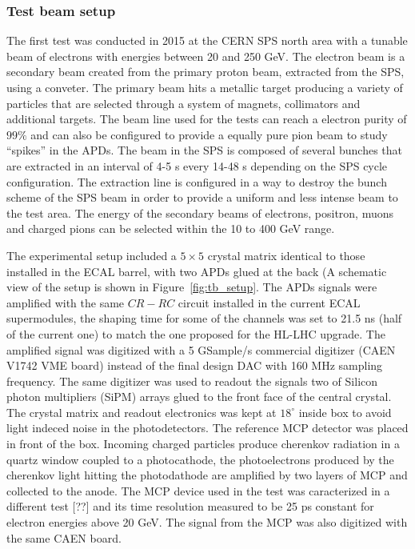 \subsubsection{Test beam setup}
\label{sec:tb_2015}
The first test was conducted in 2015 at the CERN SPS north area with a tunable beam of electrons with energies between 20 and 250 GeV.
The electron beam is a secondary beam created from the primary proton beam, extracted from the SPS, using a conveter.
The primary beam hits a metallic target producing a variety of particles that are selected through a system of magnets, collimators
and additional targets. The beam line used for the tests can reach a electron purity of $99\%$ and can also be
configured to provide a equally pure pion beam to study ``spikes'' in the APDs.
The beam in the SPS is composed of several bunches that are extracted in an interval of 4-5 s every 14-48 s depending on the
SPS cycle configuration. The extraction line is configured in a way to destroy the bunch scheme of the SPS beam in order
to provide a uniform and less intense beam to the test area.
The energy of the secondary beams of electrons, positron, muons and charged pions can be selected within the 10 to 400 GeV
range. 

The experimental setup included a $5\times 5$ \PbWO crystal matrix identical to those installed in the ECAL barrel,
with two APDs glued at the back (A schematic view of the setup is shown in Figure~\ref{fig:tb_setup}.
The APDs signals were amplified with the same $CR-RC$ circuit installed in the current ECAL
supermodules, the shaping time for some of the channels was set to 21.5 ns (half of the current one) to match the
one proposed for the HL-LHC upgrade.
The amplified signal was digitized with a 5 GSample/s commercial digitizer (CAEN V1742 VME board)
instead of the final design
DAC with 160 MHz sampling frequency. The same digitizer was used to readout the signals two of Silicon photon multipliers (SiPM)
arrays glued to the front face of the central crystal.
The crystal matrix and readout electronics was kept at $18^{\circ}$ inside box to avoid
light indeced noise in the photodetectors. The reference MCP detector was placed in front of the box. 
Incoming charged particles produce cherenkov radiation in a quartz window coupled to a photocathode,
the photoelectrons produced by the cherenkov light hitting
the photodathode are amplified by two layers of MCP and collected to the anode. 
The MCP device used in the test was caracterized 
in a different test [??] and its time resolution measured to be 25 ps constant for electron energies
above 20 GeV. The signal from the MCP was also digitized with the same CAEN board.

